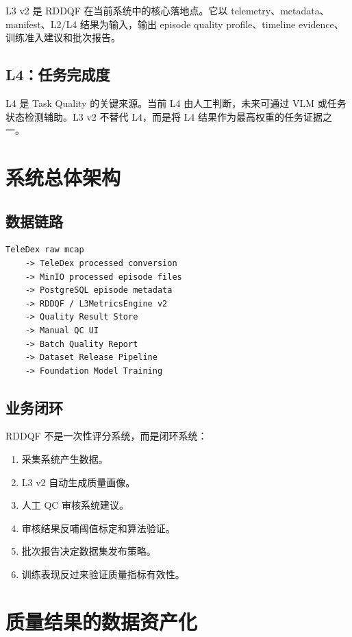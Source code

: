 \documentclass[UTF8,zihao=-4,oneside,openany]{ctexrep}
\begin{document}
L3 v2 是 RDDQF 在当前系统中的核心落地点。它以 telemetry、metadata、manifest、L2/L4 结果为输入，输出 episode quality profile、timeline evidence、训练准入建议和批次报告。

\subsection{L4：任务完成度}

L4 是 Task Quality 的关键来源。当前 L4 由人工判断，未来可通过 VLM 或任务状态检测辅助。L3 v2 不替代 L4，而是将 L4 结果作为最高权重的任务证据之一。

\section{系统总体架构}

\subsection{数据链路}

\begin{verbatim}
TeleDex raw mcap
    -> TeleDex processed conversion
    -> MinIO processed episode files
    -> PostgreSQL episode metadata
    -> RDDQF / L3MetricsEngine v2
    -> Quality Result Store
    -> Manual QC UI
    -> Batch Quality Report
    -> Dataset Release Pipeline
    -> Foundation Model Training
\end{verbatim}

\subsection{业务闭环}

RDDQF 不是一次性评分系统，而是闭环系统：

\begin{enumerate}
\item 采集系统产生数据。
\item L3 v2 自动生成质量画像。
\item 人工 QC 审核系统建议。
\item 审核结果反哺阈值标定和算法验证。
\item 批次报告决定数据集发布策略。
\item 训练表现反过来验证质量指标有效性。
\end{enumerate}

\section{质量结果的数据资产化}
\end{document}
